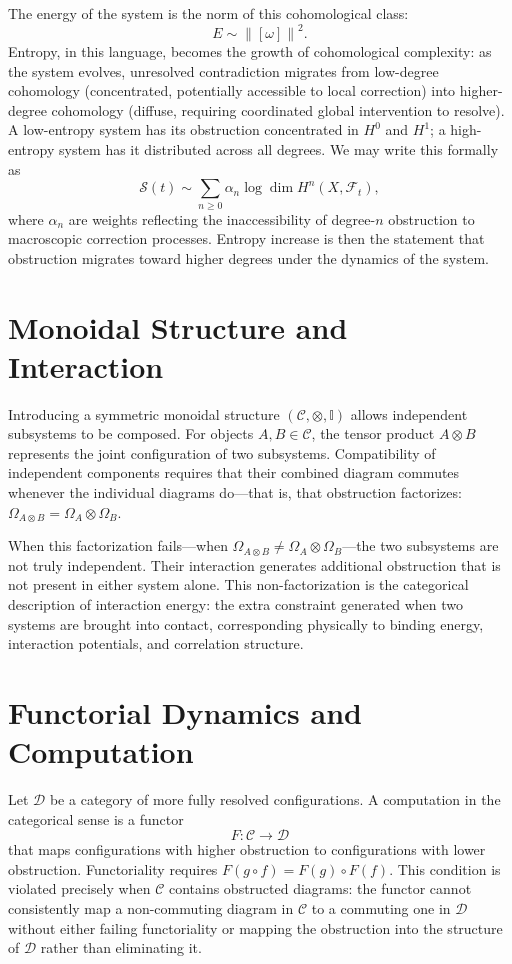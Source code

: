 \documentclass[12pt,a4paper,openany]{book}
\theoremstyle{plain}
\theoremstyle{definition}
\theoremstyle{remark}
\newcommand{\Energy}{E}
\newcommand{\norm}[1]{\left\|#1\right\|}
\begin{document}
The energy of the system is the norm of this cohomological class:
\[
\Energy \sim \norm{[\omega]}^2.
\]
Entropy, in this language, becomes the growth of cohomological complexity: as the system evolves, unresolved contradiction migrates from low-degree cohomology (concentrated, potentially accessible to local correction) into higher-degree cohomology (diffuse, requiring coordinated global intervention to resolve). A low-entropy system has its obstruction concentrated in $H^0$ and $H^1$; a high-entropy system has it distributed across all degrees. We may write this formally as
\[
\mathcal{S}(t) \sim \sum_{n \geq 0} \alpha_n \log \dim H^n(X, \mathcal{F}_t),
\]
where $\alpha_n$ are weights reflecting the inaccessibility of degree-$n$ obstruction to macroscopic correction processes. Entropy increase is then the statement that obstruction migrates toward higher degrees under the dynamics of the system.

\section{Monoidal Structure and Interaction}

Introducing a symmetric monoidal structure $(\mathcal{C}, \otimes, \mathbb{I})$ allows independent subsystems to be composed. For objects $A, B \in \mathcal{C}$, the tensor product $A \otimes B$ represents the joint configuration of two subsystems. Compatibility of independent components requires that their combined diagram commutes whenever the individual diagrams do---that is, that obstruction factorizes: $\Omega_{A \otimes B} = \Omega_A \otimes \Omega_B$.

When this factorization fails---when $\Omega_{A \otimes B} \neq \Omega_A \otimes \Omega_B$---the two subsystems are not truly independent. Their interaction generates additional obstruction that is not present in either system alone. This non-factorization is the categorical description of interaction energy: the extra constraint generated when two systems are brought into contact, corresponding physically to binding energy, interaction potentials, and correlation structure.

\section{Functorial Dynamics and Computation}

Let $\mathcal{D}$ be a category of more fully resolved configurations. A computation in the categorical sense is a functor
\[
F : \mathcal{C} \to \mathcal{D}
\]
that maps configurations with higher obstruction to configurations with lower obstruction. Functoriality requires $F(g \circ f) = F(g) \circ F(f)$. This condition is violated precisely when $\mathcal{C}$ contains obstructed diagrams: the functor cannot consistently map a non-commuting diagram in $\mathcal{C}$ to a commuting one in $\mathcal{D}$ without either failing functoriality or mapping the obstruction into the structure of $\mathcal{D}$ rather than eliminating it.
\end{document}
